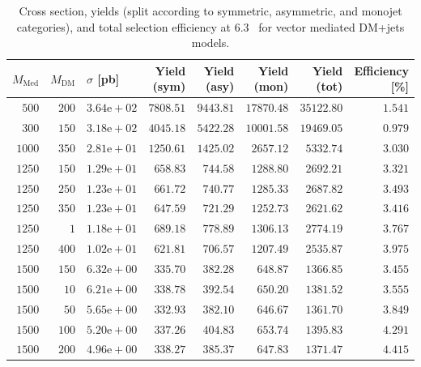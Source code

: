 \clearpage

\begin{table}
    \centering
    {\small
    \begin{tabular}{rrlrrrrr}
    \hline\hline
    $M_{\text{Med}}$ & $M_{\text{DM}}$ & $\sigma$ [pb] & Yield (sym) & Yield (asy) & Yield (mon) & Yield (tot) & Efficiency [\%] \\
    \hline
    $500$ & $200$ & $3.64\text{e}+02$ & $7808.51$ & $9443.81$ & $17870.48$ & $35122.80$ & $1.541$ \\
    $300$ & $150$ & $3.18\text{e}+02$ & $4045.18$ & $5422.28$ & $10001.58$ & $19469.05$ & $0.979$ \\
    $1000$ & $350$ & $2.81\text{e}+01$ & $1250.61$ & $1425.02$ & $2657.12$ & $5332.74$ & $3.030$ \\
    $1250$ & $150$ & $1.29\text{e}+01$ & $658.83$ & $744.58$ & $1288.80$ & $2692.21$ & $3.321$ \\
    $1250$ & $250$ & $1.23\text{e}+01$ & $661.72$ & $740.77$ & $1285.33$ & $2687.82$ & $3.493$ \\
    $1250$ & $350$ & $1.23\text{e}+01$ & $647.59$ & $721.29$ & $1252.73$ & $2621.62$ & $3.416$ \\
    $1250$ & $1$ & $1.18\text{e}+01$ & $689.18$ & $778.89$ & $1306.13$ & $2774.19$ & $3.767$ \\
    $1250$ & $400$ & $1.02\text{e}+01$ & $621.81$ & $706.57$ & $1207.49$ & $2535.87$ & $3.975$ \\
    $1500$ & $150$ & $6.32\text{e}+00$ & $335.70$ & $382.28$ & $648.87$ & $1366.85$ & $3.455$ \\
    $1500$ & $10$ & $6.21\text{e}+00$ & $338.78$ & $392.54$ & $650.20$ & $1381.52$ & $3.555$ \\
    $1500$ & $50$ & $5.65\text{e}+00$ & $332.93$ & $382.10$ & $646.67$ & $1361.70$ & $3.849$ \\
    $1500$ & $100$ & $5.20\text{e}+00$ & $337.26$ & $404.83$ & $653.74$ & $1395.83$ & $4.291$ \\
    $1500$ & $200$ & $4.96\text{e}+00$ & $338.27$ & $385.37$ & $647.83$ & $1371.47$ & $4.415$ \\
    \hline\hline
    \end{tabular}
    }
    \caption{Cross section, yields (split according to symmetric, asymmetric, 
        and monojet categories), and total selection efficiency at $6.3$~\ifb 
        for vector mediated DM+jets models.}
    \label{tab:DMV_yld}
\end{table}

